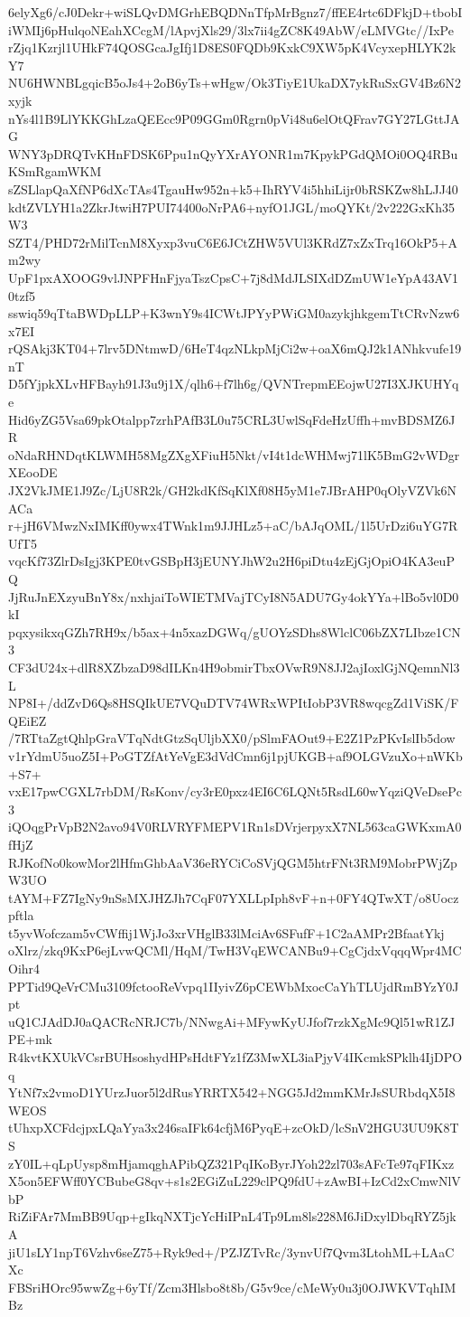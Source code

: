 6elyXg6/cJ0Dekr+wiSLQvDMGrhEBQDNnTfpMrBgnz7/ffEE4rtc6DFkjD+tbobI
iWMIj6pHulqoNEahXCcgM/lApvjXls29/3lx7ii4gZC8K49AbW/eLMVGtc//IxPe
rZjq1Kzrjl1UHkF74QOSGcaJgIfj1D8ES0FQDb9KxkC9XW5pK4VcyxepHLYK2kY7
NU6HWNBLgqicB5oJs4+2oB6yTs+wHgw/Ok3TiyE1UkaDX7ykRuSxGV4Bz6N2xyjk
nYs4l1B9LlYKKGhLzaQEEcc9P09GGm0Rgrn0pVi48u6elOtQFrav7GY27LGttJAG
WNY3pDRQTvKHnFDSK6Ppu1nQyYXrAYONR1m7KpykPGdQMOi0OQ4RBuKSmRgamWKM
sZSLlapQaXfNP6dXcTAs4TgauHw952n+k5+IhRYV4i5hhiLijr0bRSKZw8hLJJ40
kdtZVLYH1a2ZkrJtwiH7PUI74400oNrPA6+nyfO1JGL/moQYKt/2v222GxKh35W3
SZT4/PHD72rMilTcnM8Xyxp3vuC6E6JCtZHW5VUl3KRdZ7xZxTrq16OkP5+Am2wy
UpF1pxAXOOG9vlJNPFHnFjyaTszCpsC+7j8dMdJLSIXdDZmUW1eYpA43AV10tzf5
sswiq59qTtaBWDpLLP+K3wnY9s4ICWtJPYyPWiGM0azykjhkgemTtCRvNzw6x7EI
rQSAkj3KT04+7lrv5DNtmwD/6HeT4qzNLkpMjCi2w+oaX6mQJ2k1ANhkvufe19nT
D5fYjpkXLvHFBayh91J3u9j1X/qlh6+f7lh6g/QVNTrepmEEojwU27I3XJKUHYqe
Hid6yZG5Vsa69pkOtalpp7zrhPAfB3L0u75CRL3UwlSqFdeHzUffh+mvBDSMZ6JR
oNdaRHNDqtKLWMH58MgZXgXFiuH5Nkt/vI4t1dcWHMwj71lK5BmG2vWDgrXEooDE
JX2VkJME1J9Zc/LjU8R2k/GH2kdKfSqKlXf08H5yM1e7JBrAHP0qOlyVZVk6NACa
r+jH6VMwzNxIMKff0ywx4TWnk1m9JJHLz5+aC/bAJqOML/1l5UrDzi6uYG7RUfT5
vqcKf73ZlrDsIgj3KPE0tvGSBpH3jEUNYJhW2u2H6piDtu4zEjGjOpiO4KA3euPQ
JjRuJnEXzyuBnY8x/nxhjaiToWIETMVajTCyI8N5ADU7Gy4okYYa+lBo5vl0D0kI
pqxysikxqGZh7RH9x/b5ax+4n5xazDGWq/gUOYzSDhs8WlclC06bZX7LIbze1CN3
CF3dU24x+dlR8XZbzaD98dILKn4H9obmirTbxOVwR9N8JJ2ajIoxlGjNQemnNl3L
NP8I+/ddZvD6Qs8HSQIkUE7VQuDTV74WRxWPItIobP3VR8wqcgZd1ViSK/FQEiEZ
/7RTtaZgtQhlpGraVTqNdtGtzSqUljbXX0/pSlmFAOut9+E2Z1PzPKvIslIb5dow
v1rYdmU5uoZ5I+PoGTZfAtYeVgE3dVdCmn6j1pjUKGB+af9OLGVzuXo+nWKb+S7+
vxE17pwCGXL7rbDM/RsKonv/cy3rE0pxz4EI6C6LQNt5RsdL60wYqziQVeDsePc3
iQOqgPrVpB2N2avo94V0RLVRYFMEPV1Rn1sDVrjerpyxX7NL563caGWKxmA0fHjZ
RJKofNo0kowMor2lHfmGhbAaV36eRYCiCoSVjQGM5htrFNt3RM9MobrPWjZpW3UO
tAYM+FZ7IgNy9nSsMXJHZJh7CqF07YXLLpIph8vF+n+0FY4QTwXT/o8Uoczpftla
t5yvWofczam5vCWffij1WjJo3xrVHglB33lMciAv6SFufF+1C2aAMPr2BfaatYkj
oXlrz/zkq9KxP6ejLvwQCMl/HqM/TwH3VqEWCANBu9+CgCjdxVqqqWpr4MCOihr4
PPTid9QeVrCMu3109fctooReVvpq1IIyivZ6pCEWbMxocCaYhTLUjdRmBYzY0Jpt
uQ1CJAdDJ0aQACRcNRJC7b/NNwgAi+MFywKyUJfof7rzkXgMc9Ql51wR1ZJPE+mk
R4kvtKXUkVCsrBUHsoshydHPsHdtFYz1fZ3MwXL3iaPjyV4IKcmkSPklh4IjDPOq
YtNf7x2vmoD1YUrzJuor5l2dRusYRRTX542+NGG5Jd2mmKMrJsSURbdqX5I8WEOS
tUhxpXCFdcjpxLQaYya3x246saIFk64cfjM6PyqE+zcOkD/lcSnV2HGU3UU9K8TS
zY0IL+qLpUysp8mHjamqghAPibQZ321PqIKoByrJYoh22zl703sAFcTe97qFIKxz
X5on5EFWff0YCBubeG8qv+s1s2EGiZuL229clPQ9fdU+zAwBI+IzCd2xCmwNlVbP
RiZiFAr7MmBB9Uqp+gIkqNXTjcYcHiIPnL4Tp9Lm8ls228M6JiDxylDbqRYZ5jkA
jiU1sLY1npT6Vzhv6seZ75+Ryk9ed+/PZJZTvRc/3ynvUf7Qvm3LtohML+LAaCXc
FBSriHOrc95wwZg+6yTf/Zcm3Hlsbo8t8b/G5v9ce/cMeWy0u3j0OJWKVTqhIMBz
